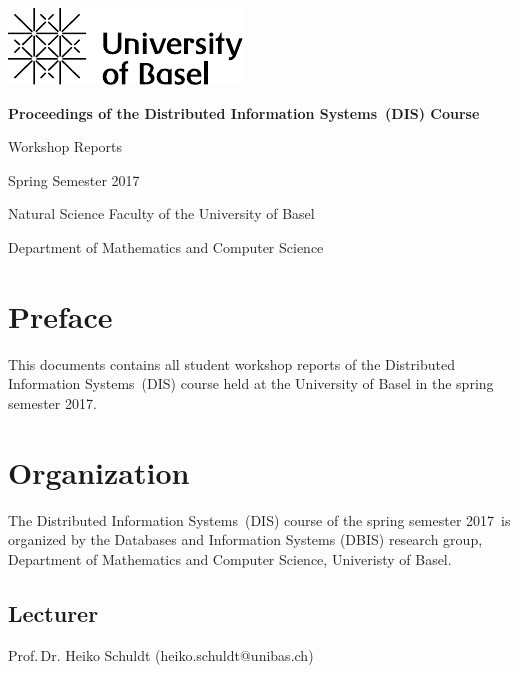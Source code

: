 \documentclass[runningheads]{llncs}
\newenvironment{produceProceedings}{}{}
\newcommand{\coursename}{Distributed Information Systems}
\newcommand{\courseacronym}{DIS}
\newcommand{\semester}{spring semester 2017}
\newcommand{\semesterCapitals}{Spring Semester 2017}
\begin{document}
	
\begin{produceProceedings}
	\begin{titlepage}
		\includegraphics{UniBas_Logo_EN_Schwarz_RGB_65}
		
		\vspace{80pt}
		
		\centering
		
		\begin{spacing}{2.8}
		{\Huge {} \bfseries Proceedings of the \coursename\ (\courseacronym) Course}
		\end{spacing}
		
		\vspace{25pt}
		
		{\large Workshop Reports}
		
		\vspace{50pt}
		
		{\large \semesterCapitals}
		
		\vspace{50pt}
		
		{\large Natural Science Faculty of the University of Basel}
		
		\vspace{2pt}
		
		{\large	Department of Mathematics and Computer Science}
	\end{titlepage}	
	
	\pagestyle{headings}
	\chapter*{Preface}
	This documents contains all student workshop reports of the \coursename\ (\courseacronym) course held at the University of Basel in the \semester.
	\chapter*{Organization}
	The \coursename\ (\courseacronym) course of the \semester\ is organized by the Databases and Information Systems (DBIS) research group, Department of Mathematics and Computer Science, Univeristy
	of Basel.
	\section*{Lecturer}
	Prof.\,Dr. Heiko Schuldt (heiko.schuldt@unibas.ch)

\end{produceProceedings}
\end{document}

